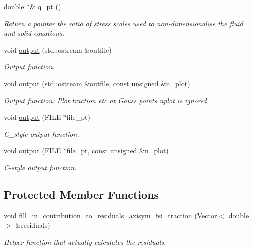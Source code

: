 \begin{DoxyCompactItemize}
double $\ast$\& \hyperlink{classoomph_1_1FSIAxisymmetricLinearElasticityTractionElement_a21c9405d5cf8a30c974016e289aaa805}{q\+\_\+pt} ()
\begin{DoxyCompactList}\small\item\em Return a pointer the ratio of stress scales used to non-\/dimensionalise the fluid and solid equations. \end{DoxyCompactList}\item 
void \hyperlink{classoomph_1_1FSIAxisymmetricLinearElasticityTractionElement_ae4a9f997d6975dea6ced9fa21603fc6b}{output} (std\+::ostream \&outfile)
\begin{DoxyCompactList}\small\item\em Output function. \end{DoxyCompactList}\item 
void \hyperlink{classoomph_1_1FSIAxisymmetricLinearElasticityTractionElement_aa8de95635c065d9ba98a1faa67802d60}{output} (std\+::ostream \&outfile, const unsigned \&n\+\_\+plot)
\begin{DoxyCompactList}\small\item\em Output function\+: Plot traction etc at \hyperlink{classoomph_1_1Gauss}{Gauss} points nplot is ignored. \end{DoxyCompactList}\item 
void \hyperlink{classoomph_1_1FSIAxisymmetricLinearElasticityTractionElement_abe362d8d30993c78c59c8ed199b40659}{output} (F\+I\+LE $\ast$file\+\_\+pt)
\begin{DoxyCompactList}\small\item\em C\+\_\+style output function. \end{DoxyCompactList}\item 
void \hyperlink{classoomph_1_1FSIAxisymmetricLinearElasticityTractionElement_a980c9a362b13a8dc33002466c13d09c9}{output} (F\+I\+LE $\ast$file\+\_\+pt, const unsigned \&n\+\_\+plot)
\begin{DoxyCompactList}\small\item\em C-\/style output function. \end{DoxyCompactList}\end{DoxyCompactItemize}
\subsection*{Protected Member Functions}
\begin{DoxyCompactItemize}
\item 
void \hyperlink{classoomph_1_1FSIAxisymmetricLinearElasticityTractionElement_a73cd868800f66ddb79fcc8f2dcf05a70}{fill\+\_\+in\+\_\+contribution\+\_\+to\+\_\+residuals\+\_\+axisym\+\_\+fsi\+\_\+traction} (\hyperlink{classoomph_1_1Vector}{Vector}$<$ double $>$ \&residuals)
\begin{DoxyCompactList}\small\item\em Helper function that actually calculates the residuals. \end{DoxyCompactList}\end{DoxyCompactItemize}
